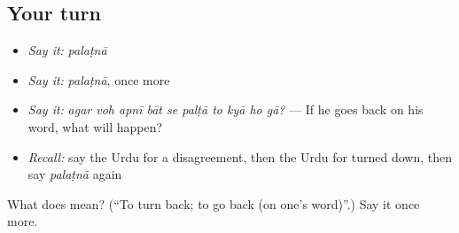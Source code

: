 \subsection*{Your turn}
\begin{itemize}
\raggedright
  \item \emph{Say it:} \emph{palaṭnā}
  \item \emph{Say it:} \emph{palaṭnā}, once more
  \item \emph{Say it:} \emph{agar voh apnī bāt se palṭā to kyā ho gā?} — If he goes back on his word, what will happen?
  \item \emph{Recall:} say the Urdu for a disagreement, then the Urdu for turned down, then say \emph{palaṭnā} again
\end{itemize}

\begin{tcolorbox}[breakable,colback=teal!4,colframe=teal!35!black,title={Before you move on}]
What does  mean? (\textquotedblleft{}To turn back; to go back (on one's word)\textquotedblright{}.) Say it once more.
\end{tcolorbox}
